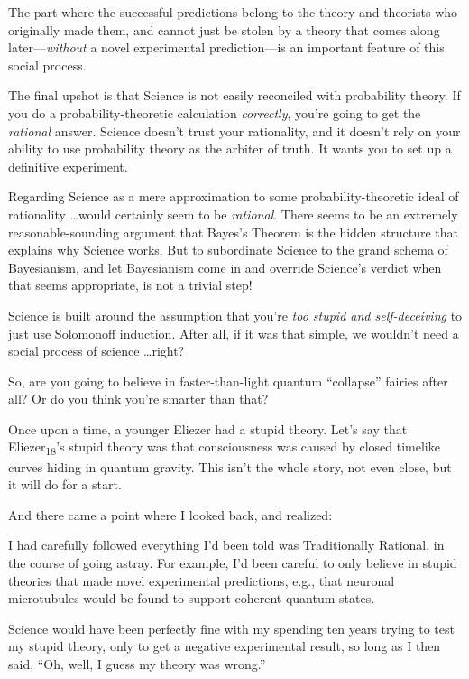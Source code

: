 {
 The part where the successful predictions belong to the theory and
theorists who originally made them, and cannot just be stolen by a
theory that comes along later---\textit{without} a novel experimental
prediction---is an important feature of this social process.}

{
 The final upshot is that Science is not easily reconciled with
probability theory. If you do a probability-theoretic calculation
\textit{correctly}, you're going to get the
\textit{rational} answer. Science doesn't trust your
rationality, and it doesn't rely on your ability to use
probability theory as the arbiter of truth. It wants you to set up a
definitive experiment.}

{
 Regarding Science as a mere approximation to some
probability-theoretic ideal of rationality \ldots would certainly seem
to be \textit{rational}. There seems to be an extremely
reasonable-sounding argument that Bayes's Theorem is
the hidden structure that explains why Science works. But to
subordinate Science to the grand schema of Bayesianism, and let
Bayesianism come in and override Science's verdict when
that seems appropriate, is not a trivial step!}

{
 Science is built around the assumption that you're
\textit{too stupid and self-deceiving} to just use Solomonoff
induction. After all, if it was that simple, we
wouldn't need a social process of science \ldots right?}

{
 So, are you going to believe in faster-than-light quantum
``collapse'' fairies after all? Or
do you think you're smarter than that?}

\myendsectiontext


{
 Once upon a time, a younger Eliezer had a stupid theory.
Let's say that
Eliezer\textsubscript{18}'s stupid theory was that
consciousness was caused by closed timelike curves hiding in quantum
gravity. This isn't the whole story, not even close,
but it will do for a start. }

{
 And there came a point where I looked back, and realized:}

{
 I had carefully followed everything I'd been told
was Traditionally Rational, in the course of going astray. For example,
I'd been careful to only believe in stupid theories
that made novel experimental predictions, e.g., that neuronal
microtubules would be found to support coherent quantum states.}

{
 Science would have been perfectly fine with my spending ten years
trying to test my stupid theory, only to get a negative experimental
result, so long as I then said, ``Oh, well, I guess my
theory was wrong.''}

